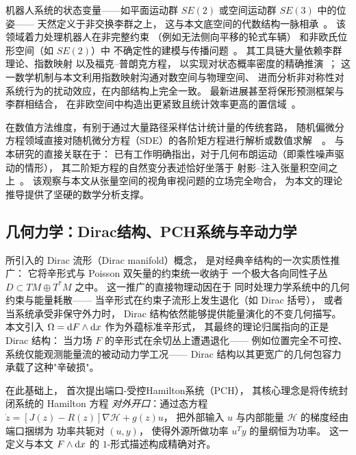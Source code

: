 ﻿\documentclass[10pt,a4paper]{article}
\numberwithin{equation}{section}
\begin{document}
机器人系统的状态变量——如平面运动群 $SE(2)$ 或空间运动群 $SE(3)$ 中的位姿——
天然定义于非交换李群之上，
这与本文底空间的代数结构一脉相承~\cite{Murray1994Mathematical, Barfoot2017State}。
该领域着力处理机器人在非完整约束
（例如无法侧向平移的轮式车辆）
和非欧氏位形空间（如 $SE(2)$）中
不确定性的建模与传播问题~\cite{Bloch2003Nonholonomic, Bloch2015Geometric}。
其工具链大量依赖李群理论、指数映射
以及福克--普朗克方程，
以实现对状态概率密度的精确推演~\cite{Wang2019Lie, Solin2015Gaussian}；
这一数学机制与本文利用指数映射沟通对数空间与物理空间、
进而分析非对称性对系统行为的扰动效应，在内部结构上完全一致。
最新进展甚至将保形预测框架与李群相结合，
在非欧空间中构造出更紧致且统计效率更高的置信域~\cite{Klein2023Conformal}。

在数值方法维度，有别于通过大量路径采样估计统计量的传统套路，
随机偏微分方程领域直接对随机微分方程（SDE）的各阶矩方程进行解析或数值求解~\cite{Pardoux2007Stochastic, Hairer2011Ergodicity}~\cite{Jentzen2010Taylor, Kloeden2012Numerical}。
与本研究的直接关联在于：
已有工作明确指出，对于几何布朗运动（即乘性噪声驱动的情形），
其二阶矩方程的自然变分表述恰好坐落于
射影--注入张量积空间之上~\cite{Lang2017Stochastic, Flandoli2018Regularization}。
该观察与本文从张量空间的视角审视问题的立场完全吻合，
为本文的理论推导提供了坚硬的数学分析支撑。

\subsection{几何力学：Dirac结构、PCH系统与辛动力学}

\textcite{Courant1990} 所引入的 Dirac 流形（Dirac manifold）概念，
是对经典辛结构的一次实质性推广：
它将辛形式与 Poisson 双矢量的约束统一收纳于
一个极大各向同性子丛 $D \subset TM \oplus T^*M$ 之中。
这一推广的直接物理动因在于
同时处理力学系统中的几何约束与能量耗散——
当辛形式在约束子流形上发生退化（如 Dirac 括号），
或者当系统承受非保守外力时，
Dirac 结构依然能够提供能量演化的不变几何描写。
本文引入 $\Omega = \text dF \wedge \text dx$ 作为外蕴标准辛形式，
其最终的理论归属指向的正是 Dirac 结构：
当力场 $F$ 的辛形式在余切丛上遭遇退化——
例如位置完全不可控、系统仅能观测能量流的被动动力学工况——
Dirac 结构以其更宽广的几何包容力承载了这种"辛破损"。

在此基础上，\textcite{MaschkeVanDerSchaft1992} 首次提出端口-受控Hamilton系统（PCH），
其核心理念是将传统封闭系统的 Hamilton 方程
\emph{对外开口}：通过态方程
$\dot{z} = [J(z)-R(z)]\nabla\mathcal H + g(z)u$，
把外部输入 $u$ 与内部能量 $\mathcal H$ 的梯度经由端口捆绑为
功率共轭对 $(u,y)$，
使得外源所做功率 $u^T y$ 的量纲恒为功率。
这一定义与本文 $F \wedge \text dx$ 的 $1$-形式描述构成精确对齐。
\end{document}
